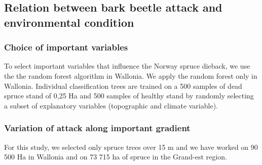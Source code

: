 \documentclass[3p,procedia]{elsarticle}
\begin{document}



\subsection{Relation between bark beetle attack and environmental condition}

\subsubsection{Choice of important variables}

To select important variables that influence the Norway spruce dieback, we use the the random forest algorithm \citep{genuer_vsurf_2015} in Wallonia.
We apply the random forest only in Wallonia.
Individual classification trees are trained on a 500 samples of dead spruce stand of 0,25 Ha and 500 samples of healthy stand by randomly selecting a subset of explanatory variables (topographic and  climate variable).


\subsubsection{Variation of attack along important gradient}
For this study, we selected only spruce trees over 15 m and we have worked on 90 500 Ha in Wallonia and  on 73 715 ha of spruce in the Grand-est region.  
			


\end{document}
